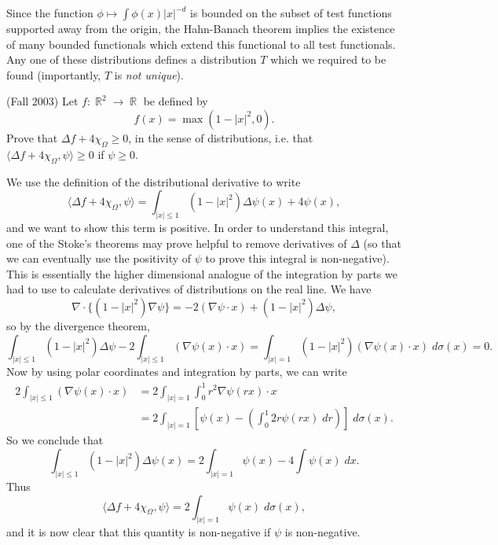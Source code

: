 \documentclass[answers]{exam}
\DeclareMathOperator{\RR}{\mathbb{R}}
\begin{document}
\begin{questions}
\begin{solution}
			Since the function $\phi \mapsto \int \phi(x) |x|^{-d}$ is bounded on the subset of test functions supported away from the origin, the Hahn-Banach theorem implies the existence of many bounded functionals which extend this functional to all test functionals. Any one of these distributions defines a distribution $T$ which we required to be found (importantly, $T$ is \emph{not unique}).
\end{solution}

\question (Fall 2003) Let $f: \RR^2 \to \RR$ be defined by
%
\[ f(x) = \max(1 - |x|^2,0). \]
%
Prove that $\Delta f + 4 \chi_\Omega \geq 0$, in the sense of distributions, i.e. that $\langle \Delta f + 4 \chi_\Omega, \psi \rangle \geq 0$ if $\psi \geq 0$.
\begin{solution}
		We use the definition of the distributional derivative to write
		\[ \langle \Delta f + 4 \chi_\Omega, \psi \rangle = \int_{|x| \leq 1} (1 - |x|^2) \Delta \psi(x) + 4 \psi(x), \]
		and we want to show this term is positive. In order to understand this integral, one of the Stoke's theorems may prove helpful to remove derivatives of $\Delta$ (so that we can eventually use the positivity of $\psi$ to prove this integral is non-negative). This is essentially the higher dimensional analogue of the integration by parts we had to use to calculate derivatives of distributions on the real line. We have
		\[ \nabla \cdot \{ (1 - |x|^2) \nabla \psi \} = - 2 (\nabla \psi \cdot x) + (1 - |x|^2) \Delta \psi, \]
		so by the divergence theorem,
		\[ \int_{|x| \leq 1} (1 - |x|^2) \Delta \psi - 2 \int_{|x| \leq 1} (\nabla \psi(x) \cdot x) = \int_{|x| = 1} (1 - |x|^2) ( \nabla \psi(x) \cdot x )\; d\sigma(x) = 0. \]
		Now by using polar coordinates and integration by parts, we can write
		\begin{align*}
			2 \int_{|x| \leq 1} (\nabla \psi(x) \cdot x) &= 2 \int_{|x| = 1} \int_0^1 r^2 \nabla \psi(rx) \cdot x\\
			&= 2 \int_{|x| = 1} \left[ \psi(x) - \left( \int_0^1 2r \psi(rx)\; dr \right) \right]\; d\sigma(x).		\end{align*}
			So we conclude that
			\[ \int_{|x| \leq 1} (1 - |x|^2) \Delta \psi(x) = 2 \int_{|x| = 1} \psi(x) - 4 \int \psi(x)\; dx. \]
			Thus
			\[ \langle \Delta f + 4 \chi_\Omega, \psi \rangle = 2 \int_{|x| = 1} \psi(x)\; d\sigma(x), \]
			and it is now clear that this quantity is non-negative if $\psi$ is non-negative.
\end{solution}










\end{questions}
\end{document}
